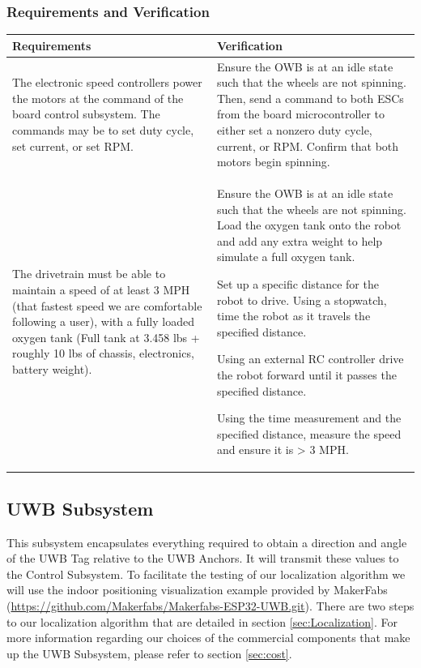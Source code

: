 \documentclass[journal,onecolumn, draftclsnofoot, 12pt]{IEEEtran}
\begin{document}
\newpage

\subsubsection{Requirements and Verification}
\begin{center}
\begin{tabular}{ | m{20em} || m{20em} | } 
  \hline
  Requirements & Verification  \\ 
  \hline
  \hline
  The electronic speed controllers power the motors at the command of the board control subsystem. The commands may be to set duty cycle, set current, or set RPM. 
  & 
  Ensure the OWB is at an idle state such that the wheels are not spinning. Then, send a command to both ESCs from the board microcontroller to either set a nonzero duty cycle, current, or RPM. Confirm that both motors begin spinning.
  \\ 
  \hline
  The drivetrain must be able to maintain a speed of at least 3 MPH (that fastest speed we are comfortable following a user), with a fully loaded oxygen tank (Full tank at 3.458 lbs + roughly 10 lbs of chassis, electronics, battery weight).
  & 
  Ensure the OWB is at an idle state such that the wheels are not spinning. Load the oxygen tank onto the robot and add any extra weight to help simulate a full oxygen tank. 
  
  Set up a specific distance for the robot to drive. Using a stopwatch, time the robot as it travels the specified distance.
  
  Using an external RC controller drive the robot forward until it passes the specified distance.
  
  Using the time measurement and the specified distance, measure the speed and ensure it is > 3 MPH.
  \\
  \hline
\end{tabular}
\end{center}

\vspace{0.8cm}

\subsection{UWB Subsystem}
This subsystem encapsulates everything required to obtain a direction and angle of the UWB Tag relative to the UWB Anchors. It will transmit these values to the Control Subsystem. To facilitate the testing of our localization algorithm we will use the indoor positioning visualization example provided by MakerFabs (\url{https://github.com/Makerfabs/Makerfabs-ESP32-UWB.git}). There are two steps to our localization algorithm that are detailed in section \ref{sec:Localization}. For more information regarding our choices of the commercial components that make up the UWB Subsystem, please refer to section \ref{sec:cost}.
\end{document}
